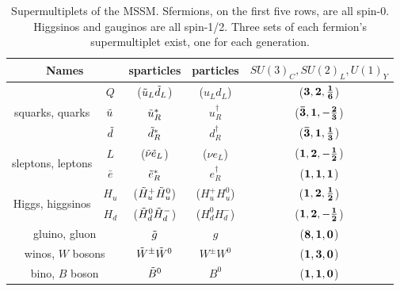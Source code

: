 \begin{table}
\begin{center}
 \begin{tabular}{cc|c|c|c}
   \hline 
   \multicolumn{2}{c|}{Names} & sparticles & particles & $SU(3)_C, SU(2)_L, U(1)_Y$ \\
   \hline
   \hline
   \multirow{3}{*}{squarks, quarks} & $Q$ 		& ($\squ[L] \sqd[L]$) & ($u_L d_L$) 		& ($\bf{3}, \bf{2}, \frac{1}{6}$) 		\\
   									& $\squ$ 	& $\squ[R]^*$ 		& $u^\dagger_R$ 	& ($\bf{\bar{3}}, \bf{1}, -\frac{2}{3}$) 	\\
   									& $\sqd$ 	& $\sqd[R]^*$ 		& $d^\dagger_R$ 	& ($\bf{\bar{3}}, \bf{1}, \frac{1}{3}$) 	\\		
   \hline
   \multirow{2}{*}{sleptons, leptons} & $L$ 	& ($\slneu \sle[L]$) & ($\nu e_L$) 		& ($\bf{1}, \bf{2}, -\frac{1}{2}$) 		\\
   									& $\bar{e}$ & $\sle[R]^*$ 		& $e^\dagger_R$ 	& ($\bf{1}, \bf{1}, 1$) 					\\
   \hline
   \multirow{2}{*}{Higgs, higgsinos} & $H_u$ 	& ($\Hou[+] \Hou[0]$) 	& ($H^+_u H^0_u$)  & ($\bf{1}, \bf{2}, \frac{1}{2}$) 	\\
   									& $H_d$ 	& ($\Hod[0] \Hod[-]$) 	& ($H^0_d H^-_d$)  & ($\bf{1}, \bf{2}, -\frac{1}{2}$) 	\\  
   \hline
   \multicolumn{2}{c|}{gluino, gluon}	& $\go$ 			& $g$			& ($\bf{8}, \bf{1}, 0$)		\\							
   \hline
   \multicolumn{2}{c|}{winos, $W$ bosons}	& $\Wo^\pm \Wo^0$ 	& $W^\pm W^0$	& ($\bf{1}, \bf{3}, 0$)		\\							
   \hline
   \multicolumn{2}{c|}{bino, $B$ boson}	& $\Bo^0$ 			& $B^0$			& ($\bf{1}, \bf{1}, 0$)		\\							

\hline
\hline
 \end{tabular}
\end{center}
 \caption{Supermultiplets of the \ac{MSSM}. Sfermions, on the first five rows, are all spin-0. Higgsinos and gauginos are all spin-1/2. Three sets of each fermion's supermultiplet exist, one for each generation. \cite{Martin:1997ns}}
 \label{tab:sparticles}
\end{table}





